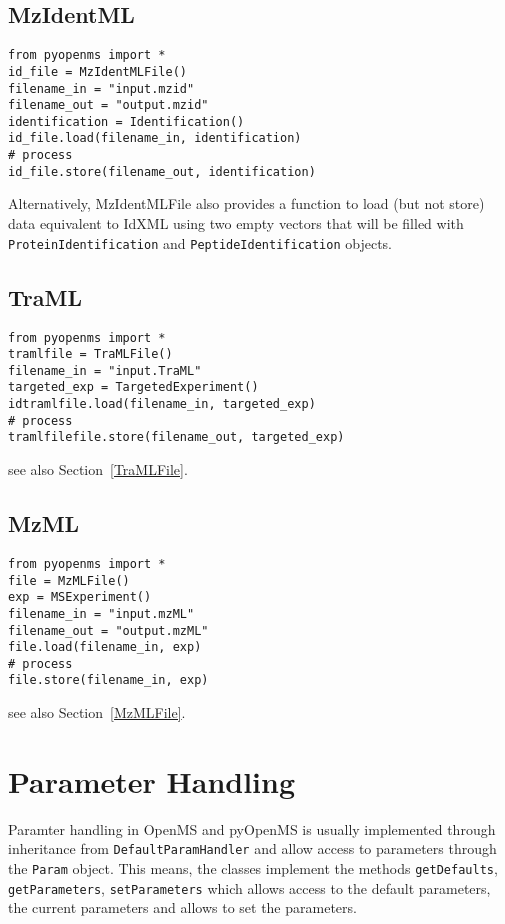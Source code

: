 \documentclass[10pt]{article}
\begin{document}
\subsection{MzIdentML}
\begin{verbatim}
from pyopenms import *
id_file = MzIdentMLFile() 
filename_in = "input.mzid"
filename_out = "output.mzid"
identification = Identification()
id_file.load(filename_in, identification)
# process 
id_file.store(filename_out, identification)
\end{verbatim}

Alternatively, MzIdentMLFile also provides a function to load (but not store)
data equivalent to IdXML using two empty vectors that will be filled with
\texttt{ProteinIdentification} and \texttt{PeptideIdentification} objects.

\subsection{TraML}
\begin{verbatim}
from pyopenms import *
tramlfile = TraMLFile() 
filename_in = "input.TraML"
targeted_exp = TargetedExperiment()
idtramlfile.load(filename_in, targeted_exp)
# process 
tramlfilefile.store(filename_out, targeted_exp)
\end{verbatim}

see also Section~\ref{TraMLFile}.

\subsection{MzML}
\begin{verbatim}
from pyopenms import *
file = MzMLFile() 
exp = MSExperiment() 
filename_in = "input.mzML"
filename_out = "output.mzML"
file.load(filename_in, exp)
# process 
file.store(filename_in, exp)
\end{verbatim}

see also Section~\ref{MzMLFile}.

\pagebreak
\section{Parameter Handling}

Paramter handling in OpenMS and pyOpenMS is usually implemented through
inheritance from \texttt{DefaultParamHandler} and allow access to parameters
through the \texttt{Param} object. This means, the classes implement the
methods \texttt{getDefaults}, \texttt{getParameters}, \texttt{setParameters}
which allows access to the default parameters, the current parameters and
allows to set the parameters.
\end{document}
